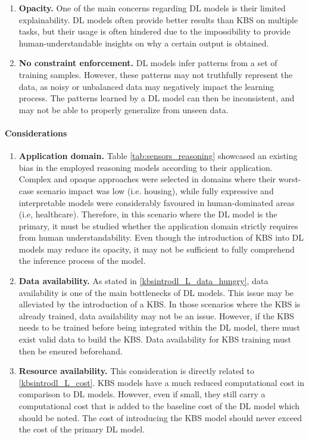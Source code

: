 \begin{enumerate} [start=1,label={\bfseries L\arabic*.}]
    \item \label{kbsintrodl_L_opacity} \textbf{Opacity.} One of the main concerns regarding DL models is their limited explainability. DL models often provide better results than KBS on multiple tasks, but their usage is often hindered due to the impossibility to provide human-understandable insights on why a certain output is obtained.
    
    \item \label{kbsintrodl_L_constraint} \textbf{No constraint enforcement.} DL models infer patterns from a set of training samples. However, these patterns may not truthfully represent the data, as noisy or unbalanced data may negatively impact the learning process. The patterns learned by a DL model can then be inconsistent, and may not be able to properly generalize from unseen data.
    \end{enumerate}
\paragraph{Considerations}
\begin{enumerate} [start=1,label={\bfseries C\arabic*.}]
    \item \label{kbsintrodl_C_domain} \textbf{Application domain.} Table \ref{tab:sensors_reasoning} showcased an existing bias in the employed reasoning models according to their application. Complex and opaque approaches were selected in domains where their worst-case scenario impact was low (i.e. housing), while fully expressive and interpretable models were considerably favoured in human-dominated areas (i.e, healthcare). Therefore, in this scenario where the DL model is the primary, it must be studied whether the application domain strictly requires from human understandability. Even though the introduction of KBS into DL models may reduce its opacity, it may not be sufficient to fully comprehend the inference process of the model. 
    
    \item  \label{kbsintrodl_C_data} \textbf{Data availability.} As stated in \ref{kbsintrodl_L_data_hungry}, data availability is one of the main bottlenecks of DL models. This issue may be alleviated by the introduction of a KBS. In those scenarios where the KBS is already trained, data availability may not be an issue. However, if the KBS needs to be trained before being integrated within the DL model, there must exist valid data to build the KBS. Data availability for KBS training must then be ensured beforehand.
    
    \item  \label{kbsintrodl_C_resource} \textbf{Resource availability.} This consideration is directly related to \ref{kbsintrodl_L_cost}. KBS models have a much reduced computational cost in comparison to DL models. However, even if small, they still carry a computational cost that is added to the baseline cost of the DL model which should be noted. The cost of introducing the KBS model should never exceed the cost of the primary DL model.
    
\end{enumerate}

